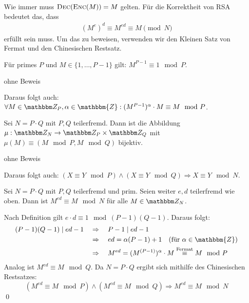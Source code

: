 Wie immer muss $\textsc{Dec}(\textsc{Enc}(M)) = M$ gelten. Für die Korrektheit von RSA
bedeutet das, dass
\begin{align*} (M^e)^d \equiv M^{ed} \equiv M \pmod N
\end{align*} erfüllt sein muss. Um das zu beweisen, verwenden wir den
Kleinen Satz von Fermat und den Chinesischen Restsatz.
\begin{theorem}\indexFermatLittleTheorem Für
  primes $P$ und $M \in \{1, \dotsc, P-1\}$ gilt: $M^{P-1} \equiv 1 \mod
  P$.
\end{theorem}
\begin{beweis} ohne Beweis
\end{beweis} Daraus folgt auch: $\forall M \in \Z P, \alpha \in
\mathbbm{Z} : (M^{P-1})^{\alpha} \cdot M \equiv M \mod P$.

\begin{theorem}\indexChineseRemainderTheorem Sei
  $N = P \cdot Q$ mit $P, Q$ teilerfremd. Dann ist die Abbildung $\mu : \Z
  N \rightarrow \Z P \times \Z Q$ mit $\mu(M) \equiv (M \mod P, M \mod Q)$
  bijektiv.
\end{theorem}
\begin{beweis} ohne Beweis
\end{beweis} Daraus folgt auch: $(X \equiv Y \mod P) \land (X \equiv Y
\mod Q) \Rightarrow X \equiv Y \mod N$.

\begin{theorem} Sei $N = P \cdot Q$ mit $P, Q$
  teilerfremd und prim. Seien weiter $e, d$ teilerfremd wie oben. Dann ist
  $M^{ed} \equiv M \mod N$ für alle $M \in \Z N$.
\end{theorem}

\begin{beweis} Nach Definition gilt $e \cdot d \equiv 1 \mod
  (P-1)(Q-1)$. Daraus folgt:
  \begin{align*}
    (P-1)(Q-1) \mid ed - 1 \quad & \Rightarrow \quad P-1 \mid ed - 1\\
                                 & \Rightarrow \quad ed = \alpha (P-1) + 1 \quad (\text{für }\alpha \in \mathbbm{Z})\\ 
                                 & \Rightarrow \quad M^{ed} = (M^{(P-1)})^{\alpha} \cdot M \stackrel{\text{Fermat}}\equiv M \mod P
  \end{align*} 
  Analog ist $M^{ed} \equiv M \mod Q$. Da $N = P \cdot Q$
  ergibt sich mithilfe des Chinesischen
  Restsatzes\indexChineseRemainderTheorem:
  \[
    (M^{ed} \equiv M \mod P) \land (M^{ed} \equiv M \mod Q) \Rightarrow M^{ed} \equiv M \mod N
  \] \qed
\end{beweis}

